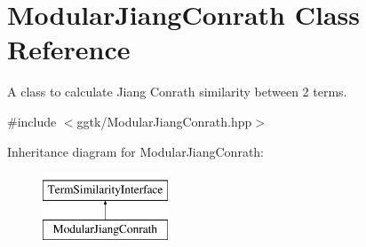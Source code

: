 \hypertarget{classModularJiangConrath}{}\section{Modular\+Jiang\+Conrath Class Reference}
\label{classModularJiangConrath}


A class to calculate Jiang Conrath similarity between 2 terms.  




{\ttfamily \#include $<$ggtk/\+Modular\+Jiang\+Conrath.\+hpp$>$}

Inheritance diagram for Modular\+Jiang\+Conrath\+:\begin{figure}[H]
\begin{center}
\leavevmode
\includegraphics[height=2.000000cm]{classModularJiangConrath}
\end{center}
\end{figure}

